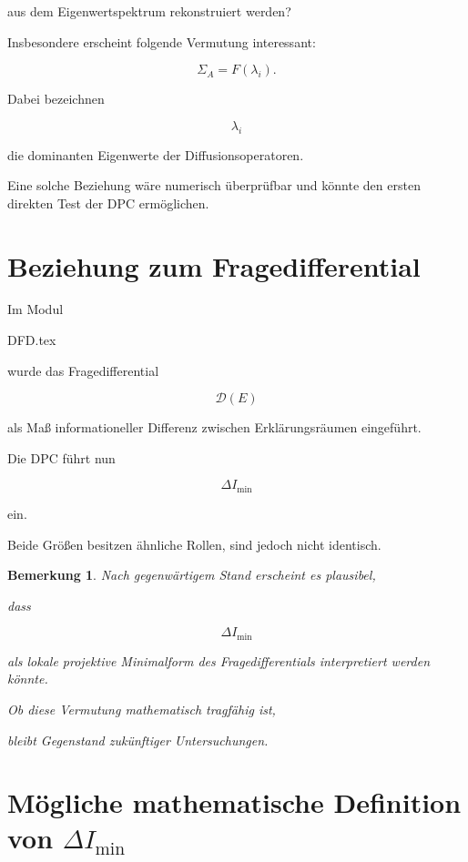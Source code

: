 \documentclass[11pt,a4paper]{article}
\newtheorem{remark}{Bemerkung}
\begin{document}
aus dem Eigenwertspektrum rekonstruiert werden?

Insbesondere erscheint folgende Vermutung
interessant:

\[
\Sigma_A
=
F(\lambda_i).
\]

Dabei bezeichnen

\[
\lambda_i
\]

die dominanten Eigenwerte
der Diffusionsoperatoren.

Eine solche Beziehung wäre numerisch überprüfbar
und könnte den ersten direkten Test
der DPC ermöglichen.

\section{Beziehung zum Fragedifferential}

Im Modul

DFD.tex

wurde das Fragedifferential

\[
\mathcal D(E)
\]

als Maß informationeller Differenz
zwischen Erklärungsräumen eingeführt.

Die DPC führt nun

\[
\Delta I_{\min}
\]

ein.

Beide Größen besitzen ähnliche Rollen,
sind jedoch nicht identisch.

\begin{remark}

Nach gegenwärtigem Stand erscheint
es plausibel,

dass

\[
\Delta I_{\min}
\]

als lokale projektive Minimalform
des Fragedifferentials interpretiert
werden könnte.

Ob diese Vermutung mathematisch tragfähig ist,

bleibt Gegenstand zukünftiger Untersuchungen.

\end{remark}

\section{Mögliche mathematische Definition von
\texorpdfstring{$\Delta I_{\min}$}{Delta I}}
\end{document}
